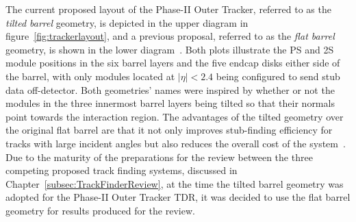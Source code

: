 The current proposed layout of the Phase-II Outer Tracker, referred to as the \emph{tilted barrel} geometry, is depicted in the upper diagram in figure~\ref{fig:trackerlayout}, and a previous proposal, referred to as the \emph{flat barrel} geometry, is shown in the lower diagram~\cite{CMS_Upgrade_TP}.
Both plots illustrate the PS and 2S module positions in the six barrel layers and the five endcap disks either side of the barrel, with only modules located at $|\eta| < 2.4$ being configured to send stub data off-detector.
Both geometries' names were inspired by whether or not the modules in the three innermost barrel layers being tilted so that their normals point towards the interaction region.
The advantages of the tilted geometry over the original flat barrel are that it not only improves stub-finding efficiency for tracks with large incident angles but also reduces the overall cost of the system~\cite{P2TrackerTDR}.
Due to the maturity of the preparations for the review between the three competing proposed track finding systems, discussed in Chapter~\ref{subsec:TrackFinderReview}, at the time the tilted barrel geometry was adopted for the Phase-II Outer Tracker TDR, it was decided to use the flat barrel geometry for results produced for the review.

